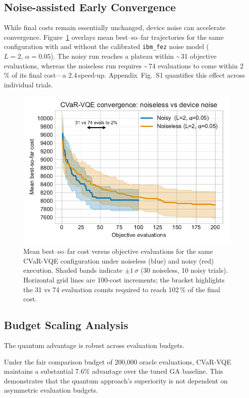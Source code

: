 \subsection{Noise-assisted Early Convergence}

While final costs remain essentially unchanged, device noise can 
accelerate convergence. Figure~\ref{fig:learning_curves_noise} overlays 
mean best–so–far trajectories for the same configuration with and without 
the calibrated \texttt{ibm\_fez} noise model (\(L=2,\,\alpha=0.05\)). The 
noisy run reaches a plateau within \textasciitilde{}\,31 objective evaluations, whereas the noiseless 
run requires \textasciitilde{}\,74 evaluations to come within 2\,\% of its final cost—a 
2.4\,\times speed-up. Appendix~Fig.~S1 quantifies this effect across individual 
trials.

\begin{figure}[h]
  \centering
  \includegraphics[width=.7\linewidth]{fig/learning_curves_noise.pdf}
  \caption{Mean best–so–far cost versus objective evaluations for the same
           CVaR-VQE configuration under noiseless (blue) and noisy (red) execution.
           Shaded bands indicate $\pm1\,\sigma$ (30 noiseless, 10 noisy trials).
           Horizontal grid lines are 100-cost increments; the bracket highlights
           the 31 vs 74 evaluation counts required to reach 102\,\% of the final
           cost.}
  \label{fig:learning_curves_noise}
\end{figure}

\subsection{Budget Scaling Analysis}

The quantum advantage is robust across evaluation budgets.

Under the fair comparison budget of 200{,}000 oracle evaluations, CVaR-VQE 
maintains a substantial 7.6\% advantage over the tuned GA baseline. This 
demonstrates that the quantum approach's superiority is not dependent on 
asymmetric evaluation budgets.

